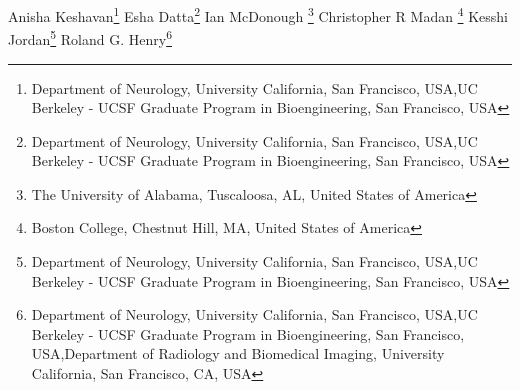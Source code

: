 \iflatexml
Anisha Keshavan\footnote[1,2]{Department of Neurology, University California, San Francisco,  USA,UC Berkeley - UCSF Graduate Program in Bioengineering, San Francisco, USA}
Esha Datta\footnote[1,2]{Department of Neurology, University California, San Francisco,  USA,UC Berkeley - UCSF Graduate Program in Bioengineering, San Francisco, USA}
Ian McDonough \footnote[3] {The University of Alabama, Tuscaloosa, AL, United States of America}
Christopher R Madan \footnote[4]{Boston College, Chestnut Hill, MA, United States of America}
Kesshi Jordan\footnote[1,2]{Department of Neurology, University California, San Francisco,  USA,UC Berkeley - UCSF Graduate Program in Bioengineering, San Francisco, USA}
Roland G. Henry\footnote[1,2,5]{Department of Neurology, University California, San Francisco,  USA,UC Berkeley - UCSF Graduate Program in Bioengineering, San Francisco, USA,Department of Radiology and Biomedical Imaging, University California, San Francisco, CA, USA}

\else %

\author[l1,l2]{Anisha Keshavan}

\author[l1,l2]{Esha Datta}

\author[3]{Ian McDonough}

\author[4]{Christopher R Madan}

\author[l1,l2]{Esha Datta}

\author[l1,l2]{Kesshi Jordan}

\author[l1,l2,5]{Roland G. Henry}

\address[l1]{Department of Neurology, University California, San Francisco,  USA}
\address[l2]{UC Berkeley - UCSF Graduate Program in Bioengineering, San Francisco, USA}
\address[3]{The University of Alabama, Tuscaloosa, AL, United States of America}
\address[4]{Boston College, Chestnut Hill, MA, United States of America}
\address[5]{Department of Radiology and Biomedical Imaging, University California, San Francisco, CA, USA}

\fi